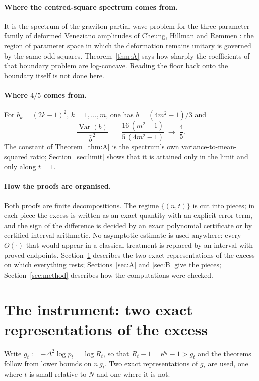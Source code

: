 \documentclass[12pt]{article}
\newcommand{\ee}{\mathrm{e}}
\DeclareMathOperator{\Var}{Var}
\begin{document}
\paragraph{Where the centred-square spectrum comes from.}
It is the spectrum of the graviton partial-wave problem for the three-parameter family of deformed Veneziano amplitudes of Cheung, Hillman and Remmen \cite{CHR2024}: the region of parameter space in which the deformation remains unitary is governed by the same odd squares. Theorem~\ref{thm:A} says how sharply the coefficients of that boundary problem are log-concave. Reading the floor back onto the boundary itself is not done here.

\paragraph{Where $4/5$ comes from.}
For $b_k = (2k-1)^2$, $k=1,\dots,m$, one has $\bar b = (4m^2-1)/3$ and
\[
\frac{\Var(b)}{\bar b^{\,2}} \;=\; \frac{16\,(m^2-1)}{5\,(4m^2-1)} \;\longrightarrow\; \frac45 .
\]
The constant of Theorem~\ref{thm:A} is the spectrum's own variance-to-mean-squared ratio; Section~\ref{sec:limit} shows that it is attained only in the limit and only along $t=1$.

\paragraph{How the proofs are organised.}
Both proofs are finite decompositions. The regime $\{(n,t)\}$ is cut into pieces; in each piece the excess is written as an exact quantity with an explicit error term, and the sign of the difference is decided by an exact polynomial certificate or by certified interval arithmetic. No asymptotic estimate is used anywhere: every $O(\cdot)$ that would appear in a classical treatment is replaced by an interval with proved endpoints. Section~\ref{sec:instrument} describes the two exact representations of the excess on which everything rests; Sections~\ref{sec:A} and \ref{sec:B} give the pieces; Section~\ref{sec:method} describes how the computations were checked.

\section{The instrument: two exact representations of the excess}\label{sec:instrument}

Write $g_t := -\Delta^2 \log p_t = \log R_t$, so that $R_t - 1 = \ee^{g_t}-1 > g_t$ and the theorems follow from lower bounds on $n\,g_t$. Two exact representations of $g_t$ are used, one where $t$ is small relative to $N$ and one where it is not.
\end{document}
